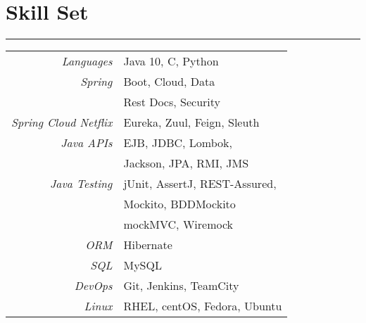 \section*{\Large \bf \color{Maroon} Skill Set}
\hrule \smallskip
\begin{tabular}{r l}
\textit{Languages} & Java 10, C, Python \smallskip\\
\textit{Spring} & Boot, Cloud, Data \\
& Rest Docs, Security\smallskip\\
\textit{Spring Cloud Netflix} & Eureka, Zuul, Feign, Sleuth \smallskip\\
\textit{Java APIs} & EJB, JDBC, Lombok, \\
 & Jackson, JPA, RMI, JMS \smallskip\\
\textit{Java Testing} & jUnit, AssertJ, REST-Assured, \\
& Mockito, BDDMockito \\ 
& mockMVC, Wiremock \smallskip\\
\textit{ORM} & Hibernate \smallskip\\
\textit{SQL} & MySQL \smallskip\\
\textit{DevOps} & Git, Jenkins, TeamCity \smallskip\\
\textit{Linux} & RHEL, centOS, Fedora, Ubuntu \\

\end{tabular}


